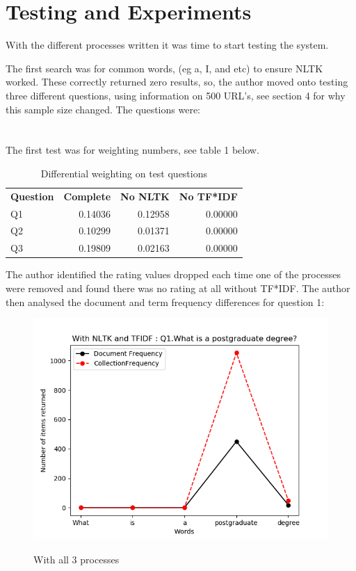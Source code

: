\documentclass{sig-alternate}
\begin{document}
{\section{Testing and Experiments}
With the different processes written it was time to start testing the system.

The first search was for common words, (eg a, I, and etc) to ensure NLTK worked. These correctly returned zero results, so, the author moved onto testing three different questions, using information on 500 URL's, see section 4 for why this sample size changed. The questions were: \newline
{} \\
\\
 \\ 
The first test was for weighting numbers, see table 1 below. 

\begin{table} [ht]
	\centering 
	\caption{Differential weighting on test questions}\label{textresult}
	\begin{tabular}{|lrrr|} \hline
		\textbf{Question} & \textbf{Complete} & \textbf{No NLTK} & \textbf{No TF*IDF} \\
		Q1 & 0.14036 & 0.12958  & 0.00000 \\
		Q2 & 0.10299 & 0.01371 & 0.00000\\
		Q3 & 0.19809 & 0.02163 & 0.00000\\
		\hline
	\end{tabular}
\end{table}

The author identified the rating values dropped each time one of the processes were removed and found there was no rating at all without TF*IDF. The author then analysed the document and term frequency differences for question 1:

\begin{figure}[H]
	\centering
	\caption{With all 3 processes}\label{fig:dist}
	\includegraphics[width=0.4 \textwidth, height=0.16 \textheight] {Q1_everything.PNG}\\
\end{figure}

}
\end{document}
